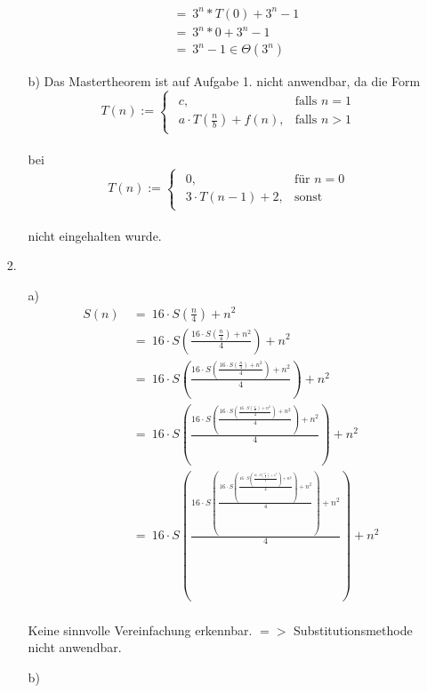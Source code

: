 \documentclass{article}
\begin{document}
\begin{enumerate}
\begin{enumerate}
\[\begin{array}{ll}
                &=~3^n*T(0)+3^n-1\\
                &=~3^n*0+3^n-1\\
                &=~3^n-1 \in \Theta (3^n)
            \end{array}
        \]
        \item [b)]
        Das Mastertheorem ist auf Aufgabe 1. nicht anwendbar, da die Form\\
        \[
		T(n) :=  \begin{cases}
					\begin{array}{ll}
						c, & \text{falls }n=1\\
						a \cdot T(\frac{n}{b})+f(n), &\text{falls }n>1
					\end{array}
				\end{cases}
    	\]
    	\\
    	bei\\
    	\[
		T(n) :=  \begin{cases}
					\begin{array}{ll}
						0, & \text{für }n=0\\
						3 \cdot T(n-1)+2, &\text{sonst}
					\end{array}
				\end{cases}
    	\]
    	\\
    	nicht eingehalten wurde.
    \end{enumerate}
    \item[2.]
    \begin{enumerate}
        \item [a)]
        \[
            \begin{array}{ll}
                S(n)~&=~16 \cdot S(\frac{n}{4})+n^2\\
                &=~16 \cdot S(\frac{16 \cdot S(\frac{n}{4})+n^2}{4})+n^2\\
                &=~16 \cdot S(\frac{16 \cdot S(\frac{16 \cdot S(\frac{n}{4})+n^2}{4})+n^2}{4})+n^2\\
                &=~16 \cdot S(\frac{16 \cdot S(\frac{16 \cdot S(\frac{16 \cdot S(\frac{n}{4})+n^2}{4})+n^2}{4})+n^2}{4})+n^2\\
                &=~16 \cdot S(\frac{16 \cdot S(\frac{16 \cdot S(\frac{16 \cdot S(\frac{16 \cdot S(\frac{n}{4})+n^2}{4})+n^2}{4})+n^2}{4})+n^2}{4})+n^2
            \end{array}
        \]
        \\
        Keine sinnvolle Vereinfachung erkennbar. $=>$ Substitutionsmethode nicht anwendbar.
        \item [b)]

\end{enumerate}
\end{enumerate}
\end{document}
